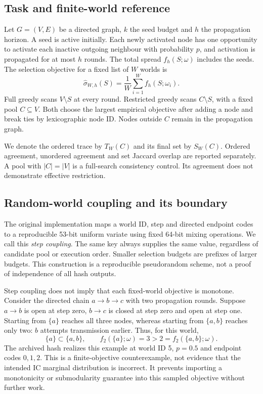 \documentclass[smallextended]{svjour3}
\begin{document}
\subsection{Task and finite-world reference}
Let $G=(V,E)$ be a directed graph, $k$ the seed budget and $h$ the propagation horizon. A seed is active initially. Each newly activated node has one opportunity to activate each inactive outgoing neighbour with probability $p$, and activation is propagated for at most $h$ rounds. The total spread $f_h(S;\omega)$ includes the seeds. The selection objective for a fixed list of $W$ worlds is
\begin{equation}
\widehat\sigma_{W,h}(S)=\frac{1}{W}\sum_{i=1}^{W}f_h(S;\omega_i).
\end{equation}
Full greedy scans $V\setminus S$ at every round. Restricted greedy scans $C\setminus S$, with a fixed pool $C\subseteq V$. Both choose the largest empirical objective after adding a node and break ties by lexicographic node ID. Nodes outside $C$ remain in the propagation graph.

We denote the ordered trace by $T_W(C)$ and its final set by $S_W(C)$. Ordered agreement, unordered agreement and set Jaccard overlap are reported separately. A pool with $|C|=|V|$ is a full-search consistency control. Its agreement does not demonstrate effective restriction.

\subsection{Random-world coupling and its boundary}\label{sec:coupling}
The original implementation maps a world ID, step and directed endpoint codes to a reproducible 53-bit uniform variate using fixed 64-bit mixing operations. We call this \emph{step coupling}. The same key always supplies the same value, regardless of candidate pool or execution order. Smaller selection budgets are prefixes of larger budgets. This construction is a reproducible pseudorandom scheme, not a proof of independence of all hash outputs.

Step coupling does not imply that each fixed-world objective is monotone. Consider the directed chain $a\rightarrow b\rightarrow c$ with two propagation rounds. Suppose $a\rightarrow b$ is open at step zero, $b\rightarrow c$ is closed at step zero and open at step one. Starting from $\{a\}$ reaches all three nodes, whereas starting from $\{a,b\}$ reaches only two: $b$ attempts transmission earlier. Thus, for this world,
\begin{equation}
\{a\}\subset\{a,b\},\qquad f_2(\{a\};\omega)=3>2=f_2(\{a,b\};\omega).
\end{equation}
The archived hash realizes this example at world ID 5, $p=0.5$ and endpoint codes $0,1,2$. This is a finite-objective counterexample, not evidence that the intended IC marginal distribution is incorrect. It prevents importing a monotonicity or submodularity guarantee into this sampled objective without further work.
\end{document}
